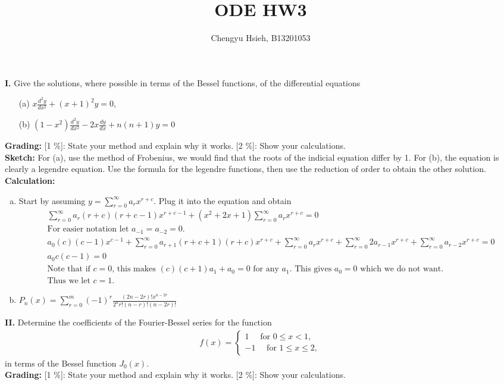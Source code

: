 \documentclass[A4paper,12pt]{article}
\title{ODE HW3}
\author{Chengyu Hsieh, B13201053}
\date{}
\theoremstyle{definition}
\numberwithin{equation}{section}
\begin{document}
\maketitle

\textbf{I.} Give the solutions, where possible in terms of the Bessel
functions, of the differential equations
\begin{enumerate}
\item [(a)]\(x\frac{d^2y}{dx^2}+(x+1)^2y=0\),
\item [(b)]\((1-x^2)\frac{d^2y}{dx^2}-2x\frac{dy}{dx}
+n(n+1)y=0\)
\end{enumerate}
\textbf{Grading:}
[1 \%]: State your method and explain why it works.
[2 \%]: Show your calculations.
\\
\textbf{Sketch: }
For (a), use the method of Frobenius, we would find that the roots of the indicial equation differ by 1.
For (b), the equation is clearly a legendre equation. Use the formula for the legendre functions, then use the reduction of order to obtain the other solution.\\
\textbf{Calculation:}
\begin{enumerate}[(a)]
    \item
        Start by assuming $y = \sum_{r=0}^\infty a_r x^{r+c}$. 
        Plug it into the equation and obtain 
        \begin{align*}
            &\sum_{r=0}^\infty a_r(r+c)(r+c-1)x^{r+c-1} + (x^2 + 2x + 1)\sum_{r=0}^\infty a_r x^{r+c} = 0\\
            &\text{For easier notation let }a_{-1} = a_{-2} = 0.\\
            &a_0 (c)(c-1)x^{c-1} + \sum_{r=0}^\infty a_{r+1}(r+c+1)(r+c)x^{r+c} +   \sum_{r=0}^\infty a_rx^{r+c} + \sum_{r=0}^\infty 2a_{r-1} x^{r+c}+ \sum_{r=0}^\infty a_{r-2}x^{r+c} = 0\\
            &a_0c(c-1) = 0\\
            &\text{Note that if $c=0$, this makes $(c)(c+1)a_1+a_0 = 0$ for any $a_1$. This gives $a_0 = 0$ which we do not want.} \\
            &\text{Thus we let $c=1$.}
        \end{align*}
    \item
        $P_n(x) = \sum_{r=0}^m (-1)^r \frac{(2n-2r)!x^{n-2r}}{2^nr!(n-r)!(n-2r)!}$
\end{enumerate}
\vspace{20pt}
\textbf{II.} Determine the coefficients of the Fourier-Bessel series
for the function
\begin{align*}
f(x)=
\begin{cases}
1 \quad \text{ for } 0 \leq x< 1,\\
-1 \quad \text{ for } 1 \leq x \leq 2,
\end{cases}
\end{align*}
in terms of the Bessel function \(J_0(x)\).\\
\textbf{Grading:}
[1 \%]: State your method and explain why it works.
[2 \%]: Show your calculations.
\end{document}
